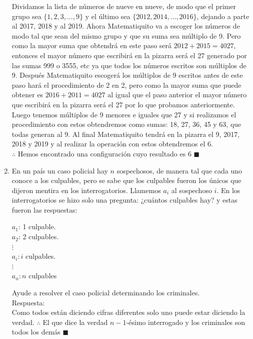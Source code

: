 \documentclass{book}
\begin{document}
\begin{enumerate}
          Dividamos la lista de números de nueve en nueve, de modo que el primer grupo sea $\{1, 2, 3, \ldots, 9\}$ y el último sea $\{2012, 2014 ,\ldots , 2016\}$, dejando a parte al 2017, 2018 y al 2019. Ahora Matematiquito va a escoger los números de modo tal que sean del mismo grupo y que su suma sea múltiplo de 9. Pero como la mayor suma que obtendrá en este paso será $2012+2015=4027$, entonces el mayor número que escribirá en la pizarra será el 27 generado por las sumas 999 o 3555, etc ya que todos los números escritos son múltiplos de 9. Después Matematiquito escogerá los múltiplos de 9 escritos antes de este paso hará el procedimiento de 2 en 2, pero como la mayor suma que puede obtener es $2016+2011=4027$ al igual que el paso anterior el mayor número que escribirá en la pizarra será el 27 por lo que probamos anteriormente. Luego tenemos múltiplos de 9 menores e iguales que 27 y si realizamos el procedimiento con estos obtendremos como sumas: 18, 27, 36, 45 y 63, que todas generan al 9. Al final Matematiquito tendrá en la pizarra el 9, 2017, 2018 y 2019 y al realizar la operación con estos obtendremos el 6.\\
          $\therefore$ Hemos encontrado una configuración cuyo resultado es 6 $\blacksquare$\\
    \item En un país un caso policial hay $n$ sospechosos, de manera tal que cada uno conoce a los culpables, pero se sabe que los culpables fueron los únicos que dijeron mentira en los interrogatorios. Llamemos $a_i$ al sospechoso $i$. En los interrogatorios se hizo solo una pregunta: ¿cuántos culpables hay? y estas fueron las respuestas:
          \begin{center}
              $a_1$: 1 culpable.\\
              $a_2$: 2 culpables.\\
              $\vdots$\\
              $a_i: i$ culpables.\\
              $\vdots$\\
              $a_n: n$ culpables
          \end{center}
          Ayude a resolver el caso policial determinando los criminales.\\
          Respuesta:\\
          Como todos están diciendo cifras diferentes solo uno puede estar diciendo la verdad. $\therefore$ El que dice la verdad $n-1$-ésimo interrogado y los criminales son todos los demás $\blacksquare$\\

\end{enumerate}
\end{document}
